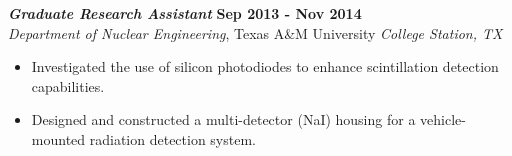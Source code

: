 {\sl\bf Graduate Research Assistant} \hfill {\bf Sep 2013 - Nov 2014} \\
{\sl Department of Nuclear Engineering}, Texas A\&M University \hfill {\sl College Station, TX} %
\vspace{2pt}
\begin{itemize}[leftmargin=4ex] \itemsep -2pt
\item Investigated the use of silicon photodiodes to enhance scintillation detection capabilities.
\item Designed and constructed a multi-detector (NaI) housing for a vehicle-mounted radiation detection system.
\end{itemize} 